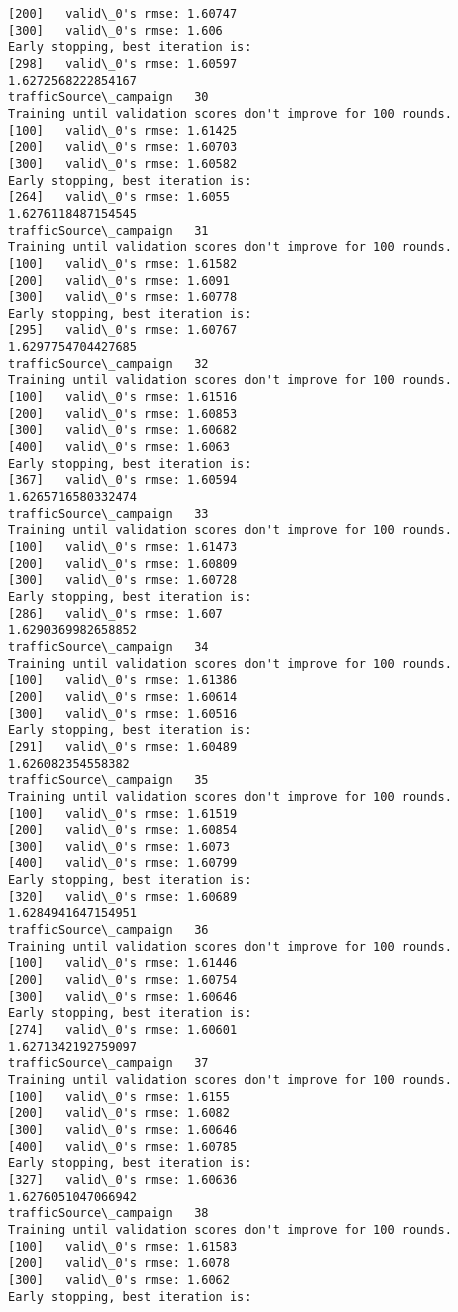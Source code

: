 \documentclass[11pt]{article}
\begin{document}
\begin{Verbatim}[commandchars=\\\{\}]
[200]	valid\_0's rmse: 1.60747
[300]	valid\_0's rmse: 1.606
Early stopping, best iteration is:
[298]	valid\_0's rmse: 1.60597
1.6272568222854167
trafficSource\_campaign   30
Training until validation scores don't improve for 100 rounds.
[100]	valid\_0's rmse: 1.61425
[200]	valid\_0's rmse: 1.60703
[300]	valid\_0's rmse: 1.60582
Early stopping, best iteration is:
[264]	valid\_0's rmse: 1.6055
1.6276118487154545
trafficSource\_campaign   31
Training until validation scores don't improve for 100 rounds.
[100]	valid\_0's rmse: 1.61582
[200]	valid\_0's rmse: 1.6091
[300]	valid\_0's rmse: 1.60778
Early stopping, best iteration is:
[295]	valid\_0's rmse: 1.60767
1.6297754704427685
trafficSource\_campaign   32
Training until validation scores don't improve for 100 rounds.
[100]	valid\_0's rmse: 1.61516
[200]	valid\_0's rmse: 1.60853
[300]	valid\_0's rmse: 1.60682
[400]	valid\_0's rmse: 1.6063
Early stopping, best iteration is:
[367]	valid\_0's rmse: 1.60594
1.6265716580332474
trafficSource\_campaign   33
Training until validation scores don't improve for 100 rounds.
[100]	valid\_0's rmse: 1.61473
[200]	valid\_0's rmse: 1.60809
[300]	valid\_0's rmse: 1.60728
Early stopping, best iteration is:
[286]	valid\_0's rmse: 1.607
1.6290369982658852
trafficSource\_campaign   34
Training until validation scores don't improve for 100 rounds.
[100]	valid\_0's rmse: 1.61386
[200]	valid\_0's rmse: 1.60614
[300]	valid\_0's rmse: 1.60516
Early stopping, best iteration is:
[291]	valid\_0's rmse: 1.60489
1.626082354558382
trafficSource\_campaign   35
Training until validation scores don't improve for 100 rounds.
[100]	valid\_0's rmse: 1.61519
[200]	valid\_0's rmse: 1.60854
[300]	valid\_0's rmse: 1.6073
[400]	valid\_0's rmse: 1.60799
Early stopping, best iteration is:
[320]	valid\_0's rmse: 1.60689
1.6284941647154951
trafficSource\_campaign   36
Training until validation scores don't improve for 100 rounds.
[100]	valid\_0's rmse: 1.61446
[200]	valid\_0's rmse: 1.60754
[300]	valid\_0's rmse: 1.60646
Early stopping, best iteration is:
[274]	valid\_0's rmse: 1.60601
1.6271342192759097
trafficSource\_campaign   37
Training until validation scores don't improve for 100 rounds.
[100]	valid\_0's rmse: 1.6155
[200]	valid\_0's rmse: 1.6082
[300]	valid\_0's rmse: 1.60646
[400]	valid\_0's rmse: 1.60785
Early stopping, best iteration is:
[327]	valid\_0's rmse: 1.60636
1.6276051047066942
trafficSource\_campaign   38
Training until validation scores don't improve for 100 rounds.
[100]	valid\_0's rmse: 1.61583
[200]	valid\_0's rmse: 1.6078
[300]	valid\_0's rmse: 1.6062
Early stopping, best iteration is:

\end{Verbatim}
\end{document}
